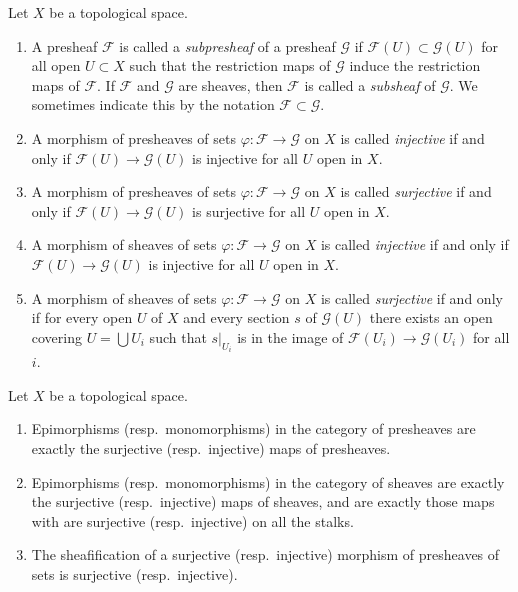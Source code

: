 \begin{definition}
\label{definition-injective-surjective}
Let $X$ be a topological space.
\begin{enumerate}
\item A presheaf $\mathcal{F}$ is called a {\it subpresheaf} of a presheaf
$\mathcal{G}$ if $\mathcal{F}(U) \subset \mathcal{G}(U)$ for all open
$U \subset X$ such that the restriction maps of $\mathcal{G}$ induce the
restriction maps of $\mathcal{F}$. If $\mathcal{F}$ and
$\mathcal{G}$ are sheaves, then $\mathcal{F}$ is called a {\it subsheaf}
of $\mathcal{G}$. We sometimes indicate this by the notation
$\mathcal{F} \subset \mathcal{G}$.
\item A morphism of presheaves of sets $\varphi : \mathcal{F} \to \mathcal{G}$
on $X$ is called {\it injective} if and only if
$\mathcal{F}(U) \to \mathcal{G}(U)$ is injective for all $U$ open in $X$.
\item A morphism of presheaves of sets $\varphi : \mathcal{F} \to \mathcal{G}$
on $X$ is called {\it surjective} if and only if
$\mathcal{F}(U) \to \mathcal{G}(U)$ is surjective for all $U$ open in $X$.
\item A morphism of sheaves of sets $\varphi : \mathcal{F} \to \mathcal{G}$
on $X$ is called {\it injective} if and only if
$\mathcal{F}(U) \to \mathcal{G}(U)$ is injective for all $U$ open in $X$.
\item A morphism of sheaves of sets $\varphi : \mathcal{F} \to \mathcal{G}$
on $X$ is called {\it surjective} if and only if for every open
$U$ of $X$ and every section $s$ of $\mathcal{G}(U)$ there exists an
open covering $U = \bigcup U_i$ such that $s|_{U_i}$ is in
the image of $\mathcal{F}(U_i) \to \mathcal{G}(U_i)$ for all $i$.
\end{enumerate}
\end{definition}


\begin{lemma}
\label{lemma-characterize-epi-mono}
Let $X$ be a topological space.
\begin{enumerate}
\item Epimorphisms (resp.\ monomorphisms) in the category of
presheaves are exactly the surjective (resp.\ injective) maps
of presheaves.
\item Epimorphisms (resp.\ monomorphisms) in the category of
sheaves are exactly the surjective (resp.\ injective) maps
of sheaves, and are exactly those maps with are surjective
(resp.\ injective) on all the stalks.
\item The sheafification of a surjective (resp.\ injective)
morphism of presheaves of sets is surjective (resp.\ injective).
\end{enumerate}
\end{lemma}

